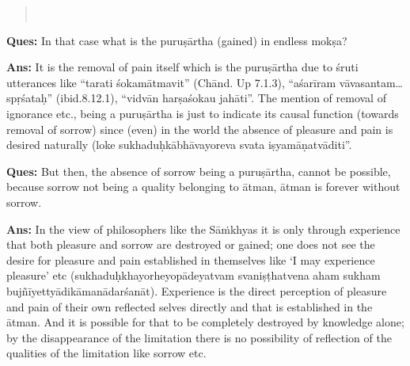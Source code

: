 \begin{verse}
\\
\end{verse}

\textbf{Ques:} In that case what is the puruṣārtha (gained) in endless mokṣa? 

\textbf{Ans:} It is the removal of pain itself which is the puruṣārtha due to śruti utterances like “tarati śokamātmavit” (Chānd. Up 7.1.3), “aśarīram vāvasantam…spṛśataḥ” (ibid.8.12.1), “vidvān harṣaśokau jahāti”. The mention of removal of ignorance etc., being a puruṣārtha is just to indicate its causal function (towards removal of sorrow) since (even) in the world the absence of pleasure and pain is desired naturally (loke sukhaduḥkābhāvayoreva svata iṣyamāṇatvāditi”.

\textbf{Ques:} But then, the absence of sorrow being a puruṣārtha, cannot be possible, because sorrow not being a quality belonging to ātman, ātman is forever without sorrow.

\textbf{Ans:} In the view of philosophers like the Sāṁkhyas it is only through experience that both pleasure and sorrow are destroyed or gained; one does not see the desire for pleasure and pain established in themselves like ‘I may experience pleasure’ etc (sukhaduḥkhayorheyopādeyatvam svaniṣṭhatvena aham sukham bujñīyettyādikāmanādarśanāt). Experience is the direct perception of pleasure and pain of their own reflected selves directly and that is established in the ātman. And it is possible for that to be completely destroyed by knowledge alone; by the disappearance of the limitation there is no possibility of reflection of the qualities of the limitation like sorrow etc.

